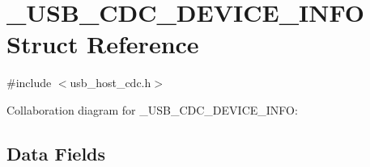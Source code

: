 \hypertarget{struct___u_s_b___c_d_c___d_e_v_i_c_e___i_n_f_o}{}\section{\+\_\+\+U\+S\+B\+\_\+\+C\+D\+C\+\_\+\+D\+E\+V\+I\+C\+E\+\_\+\+I\+N\+F\+O Struct Reference}
\label{struct___u_s_b___c_d_c___d_e_v_i_c_e___i_n_f_o}


{\ttfamily \#include $<$usb\+\_\+host\+\_\+cdc.\+h$>$}



Collaboration diagram for \+\_\+\+U\+S\+B\+\_\+\+C\+D\+C\+\_\+\+D\+E\+V\+I\+C\+E\+\_\+\+I\+N\+F\+O\+:
\subsection*{Data Fields}
